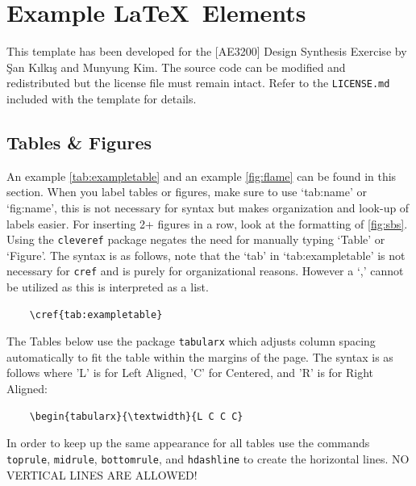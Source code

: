 \chapter{Example \LaTeX\ Elements}
This template has been developed for the [AE3200] Design Synthesis Exercise by
\c{S}an K{\i}lk{\i}\c{s} and Munyung Kim. The source code can be modified and
redistributed but the license file must remain intact. Refer to the
\texttt{LICENSE.md} included with the template for details.

\section{Tables \& Figures}
An example \cref{tab:exampletable} and an example \cref{fig:flame} can be found
in this section. When you label tables or figures, make sure to use `tab:name'
or `fig:name', this is not necessary for syntax but makes organization and
look-up of labels easier. For inserting 2+ figures in a row, look at the
formatting of \cref{fig:sbs}. Using the \texttt{cleveref} package
negates the need for manually typing `Table' or `Figure'. The syntax is as
follows, note that the `tab' in `tab:exampletable' is not necessary for
\texttt{cref} and is purely for organizational reasons. However a `,' cannot be
utilized as this is interpreted as a list.

\begin{verbatim}
    \cref{tab:exampletable}
\end{verbatim}

The Tables below use the package \texttt{tabularx} which adjusts column spacing
automatically to fit the table within the margins of the page. The syntax is as
follows where 'L' is for Left Aligned, 'C' for Centered, and 'R' is for Right
Aligned:

\begin{verbatim}
    \begin{tabularx}{\textwidth}{L C C C}
\end{verbatim}

In order to keep up the same appearance for all tables use the commands
\texttt{toprule}, \texttt{midrule}, \texttt{bottomrule}, and \texttt{hdashline}
to create the horizontal lines. NO VERTICAL LINES ARE ALLOWED!

